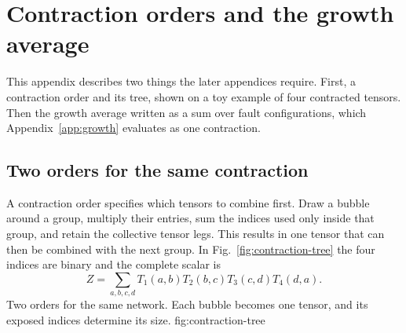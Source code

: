 
\providecommand{\hl}[2]{\colorbox{#1!22}{#2}}
\section{Contraction orders and the growth average}\label{app:tensor-examples-v2}

This appendix describes two things the later appendices require. First, a contraction order and its tree, shown on a toy example of four contracted tensors. Then the growth average written as a sum over fault configurations, which Appendix~\ref{app:growth} evaluates as one contraction.
\subsection{Two orders for the same contraction}
A contraction order specifies which tensors to combine first. Draw a bubble around a group, multiply their entries, sum the indices used only inside that group, and retain the collective tensor legs. 
This results in one tensor that can then be combined with the next group. 
In Fig.~\ref{fig:contraction-tree} the four indices are binary and the complete scalar is
\begin{equation}
 Z=\sum_{a,b,c,d}T_1(a,b)T_2(b,c)T_3(c,d)T_4(d,a).
 \label{eq:treeexample}
\end{equation}
{\color{black}
{Two orders for the same network. Each bubble becomes one tensor, and its exposed indices determine its size.}
{fig:contraction-tree}}
\FloatBarrier


